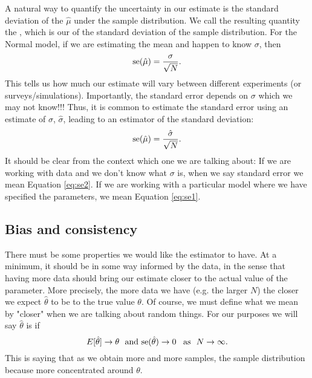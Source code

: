  A natural way to quantify the uncertainty in our estimate is the standard deviation of the $\hat{\mu}$ under the sample distribution.  We call the resulting quantity the , which is our  of the standard deviation of the sample distribution.  For the Normal model, if we are estimating the mean and happen to know $\sigma$, then 
\begin{equation}\label{eq:se1}
{\rm se}(\hat{\mu}) =  \frac{\sigma}{\sqrt{N}}. 
\end{equation}
This tells us how much our estimate will vary between different experiments (or surveys/simulations). 
Importantly, the standard error depends on $\sigma$ which we may not know!!! Thus, it is common to estimate the standard error using an estimate of $\sigma$, $\hat{\sigma}$, leading to an estimator of the standard deviation:
\begin{equation}\label{eq:se2}
{\rm se}(\hat{\mu}) =  \frac{\hat{\sigma}}{\sqrt{N}}. 
\end{equation}
It should be clear from the context which one we are talking about: If we are working with data and we don't know what $\sigma$ is, when we say standard error we mean Equation \ref{eq:se2}. If we are working with a particular model where we have specified the parameters, we mean Equation \ref{eq:se1}. 







\subsection{Bias and consistency}

 There must be some properties we would like the estimator to have. At a minimum, it should be in some way informed by the data, in the sense that having more data should bring our estimate closer to the actual value of the parameter. More precisely, the more data we have (e.g. the larger $N$) the closer we expect $\hat{\theta}$ to be to the true value $\theta$. Of course, we must define what we mean by "closer" when we are talking about random things. 
For our purposes we will say $\hat{\theta}$ is  if 
\begin{equation*}
E[\hat{\theta}] \to \theta\,\,\text{ and } {\rm se}(\hat{\theta})  \to 0 \,\,\,\text{ as }\,\, N\to \infty. 
\end{equation*}
This is saying that as we obtain more and more samples, the sample distribution because more concentrated around $\theta$. 


